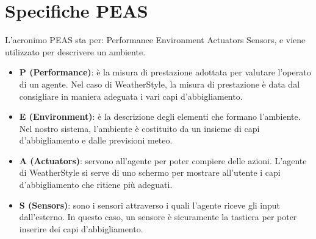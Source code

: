 \documentclass[a4paper, 11pt, oneside]{report}
\begin{document}
            \section{Specifiche PEAS}
            L'acronimo PEAS sta per: Performance Environment Actuators Sensors, e viene utilizzato per descrivere un ambiente.
            \begin{itemize}
                \item \textbf{P (Performance)}: è la misura di prestazione adottata per valutare l'operato di un agente.
                Nel caso di WeatherStyle, la misura di prestazione è data dal consigliare in maniera adeguata i vari capi
                d'abbigliamento.
                \item \textbf{E (Environment)}: è la descrizione degli elementi che formano l'ambiente. Nel nostro
                sistema, l'ambiente è costituito da un insieme di capi d'abbigliamento e dalle previsioni meteo.
                \item \textbf{A (Actuators)}: servono all'agente per poter compiere delle azioni. L'agente di WeatherStyle
                si serve di uno schermo per mostrare all'utente i capi d'abbigliamento che ritiene più adeguati.
                \item \textbf{S (Sensors)}: sono i sensori attraverso i quali l'agente riceve gli input dall'esterno. In
                questo caso, un sensore è sicuramente la tastiera per poter inserire dei capi d'abbigliamento.
            \end{itemize}
\end{document}
